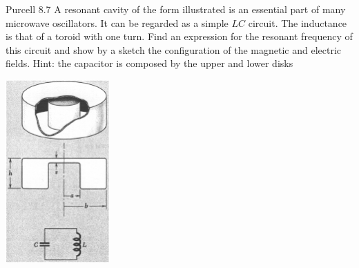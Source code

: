 \documentclass[makesolutionspdf]{esg8022pset}
\begin{document}
\begin{problem}{Purcell 8.7}
  A resonant cavity of the form illustrated is an essential part of many
  microwave oscillators. It can be regarded as a simple $LC$ circuit. The
  inductance is that of a toroid with one turn. Find an expression for the
  resonant frequency of this circuit and show by a sketch the configuration
  of the magnetic and electric fields.
  Hint: the capacitor is composed by the upper and lower disks
  \begin{center}
    \includegraphics[width = 4cm]{pu807}
  \end{center}
\end{problem}
\end{document}
